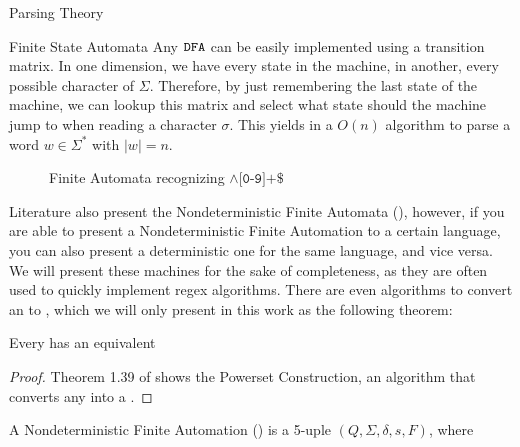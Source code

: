 \begin{section}{Parsing Theory}
\begin{subsection}{Finite State Automata}
Any $\texttt{DFA}$ can be easily implemented using a transition
matrix. In one dimension, we have every state in the machine, in another,
every possible character of $\Sigma$.  Therefore, by just remembering the
last state of the machine, we can lookup this matrix and select what state
should the machine jump to when reading a character $\sigma$. This
yields in a $O(n)$ algorithm to parse a word $w \in \Sigma^*$ with $|w| = n$.


\begin{figure}

\caption{Finite Automata recognizing $\land\texttt{[0-9]+\$}$}
\label{fig:a_automata}
\end{figure}

Literature also present the Nondeterministic Finite Automata (), however,
if you are able to present a Nondeterministic Finite Automation to a
certain language, you can also present a deterministic one for the same
language, and vice versa. We will present these machines for the sake
of completeness, as they are often used to quickly implement regex
algorithms. There are even algorithms to convert an  to
, which we will only present in this work as the following
theorem:

\begin{theorem}\label{nfa_to_dfa}
Every  has an equivalent 
\end{theorem}
\begin{proof}
	Theorem 1.39 of \citep{sipser2012} shows the Powerset Construction, an algorithm
	that converts any  into a .
\end{proof}


\begin{definition}
A Nondeterministic Finite Automation () is a 5-uple
$(Q, \Sigma, \delta, s, F)$, where
\begin{itemize}


\end{itemize}
\end{definition}
\end{subsection}
\end{section}

